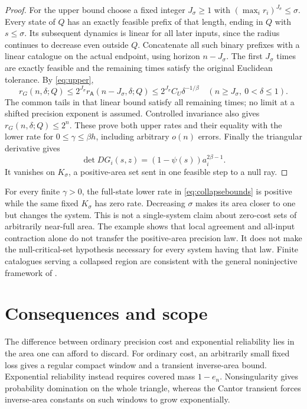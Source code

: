 \documentclass[11pt]{amsart}
\theoremstyle{definition}
\theoremstyle{remark}
\numberwithin{equation}{section}
\begin{document}
\begin{proof}
For the upper bound choose a fixed integer $J_\sigma\ge1$ with
$(\max_i r_i)^{J_\sigma}\le\sigma$. Every state of $Q$ has an
exactly feasible prefix of that length, ending in $Q$ with
$s\le\sigma$. Its subsequent dynamics is linear for all later
inputs, since the radius continues to decrease even outside $Q$.
Concatenate all such binary prefixes with a linear catalogue on
the actual endpoint, using horizon $n-J_\sigma$. The first
$J_\sigma$ times are exactly feasible and the remaining times
satisfy the original Euclidean tolerance. By \eqref{eq:upper},
\[
r_G(n,\delta;Q)\le
2^{J_\sigma}r_{\mathsf A}(n-J_\sigma,\delta;Q)
\le 2^{J_\sigma}C_U\delta^{-1/\beta}
\quad(n\ge J_\sigma,\ 0<\delta\le1).
\]
The common tails in that linear bound satisfy all remaining times;
no limit at a shifted precision exponent is assumed. Controlled
invariance also gives $r_G(n,\delta;Q)\le2^n$.
These prove both upper rates and their equality with the lower rate
for $0\le\gamma\le\beta h$, including arbitrary $o(n)$ errors.
Finally the triangular derivative gives
\[
\det DG_i(s,z)=(1-\psi(s))a_i^{2\beta-1}.
\]
It vanishes on $K_\sigma$, a positive-area set sent in one
feasible step to a null ray.
\end{proof}

For every finite $\gamma>0$, the full-state lower rate in
\eqref{eq:collapsebounds} is positive while the same fixed
$K_\sigma$ has zero rate. Decreasing $\sigma$ makes its area
closer to one but changes the system. This is not a single-system
claim about zero-cost sets of arbitrarily near-full area.
The example shows that local agreement and all-input contraction
alone do not transfer the positive-area precision law. It does not
make the null-critical-set hypothesis necessary for every system
having that law. Finite catalogues serving a collapsed region are
consistent with the general noninjective framework of \cite{CZ2024}.

\section{Consequences and scope}
The difference between ordinary precision cost and exponential
reliability lies in the area one can afford to discard. For ordinary
cost, an arbitrarily small fixed loss gives a regular compact window
and a transient inverse-area bound. Exponential reliability instead
requires covered mass $1-e_n$. Nonsingularity gives probability
domination on the whole triangle, whereas the Cantor transient
forces inverse-area constants on such windows to grow exponentially.
\end{document}
